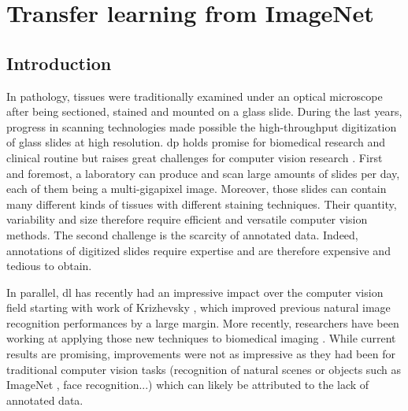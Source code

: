 \chapter{Transfer learning from ImageNet}




\section{Introduction}

In pathology, tissues were traditionally examined under an optical microscope after being sectioned, stained and mounted on a glass slide. During the last years, progress in scanning technologies made possible the high-throughput digitization of glass slides at high resolution. \acrshort{dp} holds promise for biomedical research and clinical routine but raises great challenges for computer vision research \parencite{automated-histology-signal-proc-2014}. 
First and foremost, a laboratory can produce and scan large amounts of slides per day, each of them being a multi-gigapixel image. Moreover, those slides can contain many different kinds of tissues with different staining techniques. Their quantity, variability and size therefore require efficient and versatile computer vision methods. The second challenge is the scarcity of annotated data. Indeed, annotations of digitized slides require expertise and are therefore expensive and tedious to obtain.

In parallel, \acrshort{dl} has recently had an impressive impact over the computer vision field starting with work of Krizhevsky \etal \parencite{krizhevsky2012imagenet}, which improved previous natural image recognition performances by a large margin. More recently, researchers have been working at applying those new techniques to biomedical imaging \parencite{greenspan2016guest,litjens2017survey}. While current results are promising, improvements were not as impressive as they had been for traditional computer vision tasks (recognition of natural scenes or objects such as ImageNet \parencite{deng2009imagenet}, face recognition...) which can likely be attributed to the lack of annotated data.


